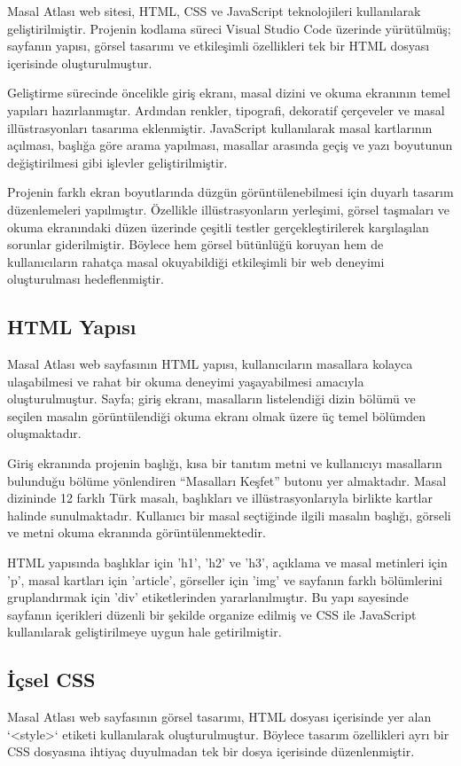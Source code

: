 \documentclass[12pt,a4paper]{article}
\begin{document}
{Masal Atlası web sitesi, HTML, CSS ve JavaScript
teknolojileri kullanılarak geliştirilmiştir. Projenin
kodlama süreci Visual Studio Code üzerinde yürütülmüş;
sayfanın yapısı, görsel tasarımı ve etkileşimli
özellikleri tek bir HTML dosyası içerisinde
oluşturulmuştur.

Geliştirme sürecinde öncelikle giriş ekranı, masal
dizini ve okuma ekranının temel yapıları hazırlanmıştır.
Ardından renkler, tipografi, dekoratif çerçeveler ve
masal illüstrasyonları tasarıma eklenmiştir. JavaScript
kullanılarak masal kartlarının açılması, başlığa göre
arama yapılması, masallar arasında geçiş ve yazı
boyutunun değiştirilmesi gibi işlevler geliştirilmiştir.

Projenin farklı ekran boyutlarında düzgün
görüntülenebilmesi için duyarlı tasarım düzenlemeleri
yapılmıştır. Özellikle illüstrasyonların yerleşimi,
görsel taşmaları ve okuma ekranındaki düzen üzerinde
çeşitli testler gerçekleştirilerek karşılaşılan
sorunlar giderilmiştir. Böylece hem görsel bütünlüğü
koruyan hem de kullanıcıların rahatça masal
okuyabildiği etkileşimli bir web deneyimi
oluşturulması hedeflenmiştir.}

\subsection{HTML Yapısı}
Masal Atlası web sayfasının HTML yapısı, kullanıcıların masallara kolayca ulaşabilmesi ve rahat bir okuma deneyimi yaşayabilmesi amacıyla oluşturulmuştur. Sayfa; giriş ekranı, masalların listelendiği dizin bölümü ve seçilen masalın görüntülendiği okuma ekranı olmak üzere üç temel bölümden oluşmaktadır.

Giriş ekranında projenin başlığı, kısa bir tanıtım metni ve kullanıcıyı masalların bulunduğu bölüme yönlendiren “Masalları Keşfet” butonu yer almaktadır. Masal dizininde 12 farklı Türk masalı, başlıkları ve illüstrasyonlarıyla birlikte kartlar halinde sunulmaktadır. Kullanıcı bir masal seçtiğinde ilgili masalın başlığı, görseli ve metni okuma ekranında görüntülenmektedir.

HTML yapısında başlıklar için 'h1', 'h2' ve 'h3', açıklama ve masal metinleri için 'p', masal kartları için 'article', görseller için 'img' ve sayfanın farklı bölümlerini gruplandırmak için 'div' etiketlerinden yararlanılmıştır. Bu yapı sayesinde sayfanın içerikleri düzenli bir şekilde organize edilmiş ve CSS ile JavaScript kullanılarak geliştirilmeye uygun hale getirilmiştir.

\subsection{İçsel CSS}
Masal Atlası web sayfasının görsel tasarımı, HTML dosyası içerisinde yer alan `<style>` etiketi kullanılarak oluşturulmuştur. Böylece tasarım özellikleri ayrı bir CSS dosyasına ihtiyaç duyulmadan tek bir dosya içerisinde düzenlenmiştir.
\end{document}
